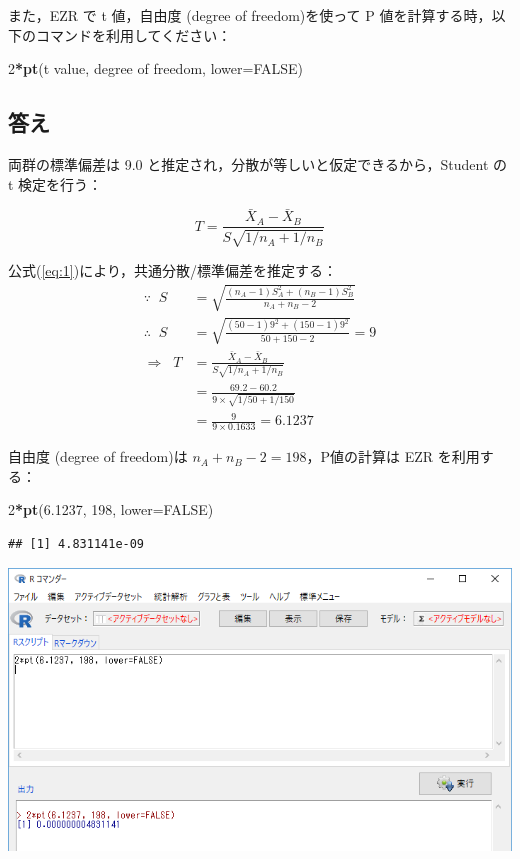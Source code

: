 \documentclass[11pt,]{problemset}
\newenvironment{Shaded}{\begin{snugshade}}{\end{snugshade}}
\newcommand{\DataTypeTok}[1]{\textcolor[rgb]{0.13,0.29,0.53}{#1}}
\newcommand{\DecValTok}[1]{\textcolor[rgb]{0.00,0.00,0.81}{#1}}
\newcommand{\FloatTok}[1]{\textcolor[rgb]{0.00,0.00,0.81}{#1}}
\newcommand{\KeywordTok}[1]{\textcolor[rgb]{0.13,0.29,0.53}{\textbf{#1}}}
\newcommand{\NormalTok}[1]{#1}
\newcommand{\OperatorTok}[1]{\textcolor[rgb]{0.81,0.36,0.00}{\textbf{#1}}}
\newcommand{\OtherTok}[1]{\textcolor[rgb]{0.56,0.35,0.01}{#1}}
\begin{document}
また，EZR で t 値，自由度 (degree of freedom)を使って P
値を計算する時，以下のコマンドを利用してください：

\begin{Shaded}
\begin{Highlighting}[]
\DecValTok{2}\OperatorTok{*}\KeywordTok{pt}\NormalTok{(t value, degree of freedom, }\DataTypeTok{lower=}\OtherTok{FALSE}\NormalTok{)}
\end{Highlighting}
\end{Shaded}

\subsection{答え}

両群の標準偏差は 9.0 と推定され，分散が等しいと仮定できるから，Student
の t 検定を行う：

\[
T = \frac{\bar{X}_A - \bar{X}_B}{S\sqrt{1/n_A + 1/n_B}}
\]

公式(\ref{eq:1})により，共通分散/標準偏差を推定する： \[
\begin{aligned}
\because\;\;  S & = \sqrt{\frac{(n_A - 1)S^2_A + (n_B - 1)S^2_B}{n_A + n_B -2}} \\
\therefore\;\; S & =  \sqrt{\frac{(50 - 1)9^2 + (150 - 1)9^2}{50 + 150 -2}} = 9 \\
\Rightarrow\;\; T & = \frac{\bar{X}_A - \bar{X}_B}{S\sqrt{1/n_A + 1/n_B}} \\ 
                  & = \frac{69.2 - 60.2}{9\times\sqrt{1/50 + 1/150}} \\ 
                  & = \frac{9}{9\times0.1633} = 6.1237
\end{aligned}
\]

自由度 (degree of freedom)は \(n_A + n_B -2 = 198\)，P値の計算は EZR
を利用する：

\begin{Shaded}
\begin{Highlighting}[]
\DecValTok{2}\OperatorTok{*}\KeywordTok{pt}\NormalTok{(}\FloatTok{6.1237}\NormalTok{, }\DecValTok{198}\NormalTok{, }\DataTypeTok{lower=}\OtherTok{FALSE}\NormalTok{)}
\end{Highlighting}
\end{Shaded}

\begin{verbatim}
## [1] 4.831141e-09
\end{verbatim}

\begin{center}\includegraphics[width=0.9\linewidth]{pic/tvaluepvalue00} \end{center}
\end{document}
